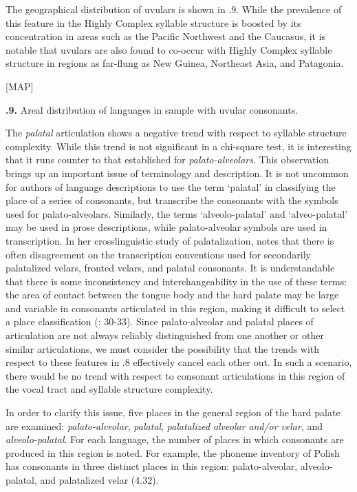   The geographical distribution of uvulars is shown in .9. While the prevalence of this feature in the Highly Complex syllable structure is boosted by its concentration in areas such as the Pacific Northwest and the Caucasus, it is notable that uvulars are also found to co-occur with Highly Complex syllable structure in regions as far-flung as New Guinea, Northeast Asia, and Patagonia.



[MAP]



\textbf{.9.} Areal distribution of languages in sample with uvular consonants.



  The \textit{palatal} articulation shows a negative trend with respect to syllable structure complexity. While this trend is not significant in a chi-square test, it is interesting that it runs counter to that established for \textit{palato-alveolars}. This observation brings up an important issue of terminology and description. It is not uncommon for authors of language descriptions to use the term ‘palatal’ in classifying the place of a series of consonants, but transcribe the consonants with the symbols used for palato-alveolars. Similarly, the terms ‘alveolo-palatal’ and ‘alveo-palatal’ may be used in prose descriptions, while palato-alveolar symbols are used in transcription. In her crosslinguistic study of palatalization, \citet{Bateman2007} notes that there is often disagreement on the transcription conventions used for secondarily palatalized velars, fronted velars, and palatal consonants. It is understandable that there is some inconsistency and interchangeability in the use of these terms: the area of contact between the tongue body and the hard palate may be large and variable in consonants articulated in this region, making it difficult to select a place classification (\citealt{LadefogedMaddieson1996}: 30-33). Since palato-alveolar and palatal places of articulation are not always reliably distinguished from one another or other similar articulations, we must consider the possibility that the trends with respect to these features in .8 effectively cancel each other out. In such a scenario, there would be no trend with respect to consonant articulations in this region of the vocal tract and syllable structure complexity.



  In order to clarify this issue, five places in the general region of the hard palate are examined: \textit{palato-alveolar}, \textit{palatal}, \textit{palatalized} \textit{alveolar} \textit{and/or} \textit{velar}, and \textit{alveolo-palatal}. For each language, the number of places in which consonants are produced in this region is noted. For example, the phoneme inventory of Polish has consonants in three distinct places in this region: palato-alveolar, alveolo-palatal, and palatalized velar (4.32).




